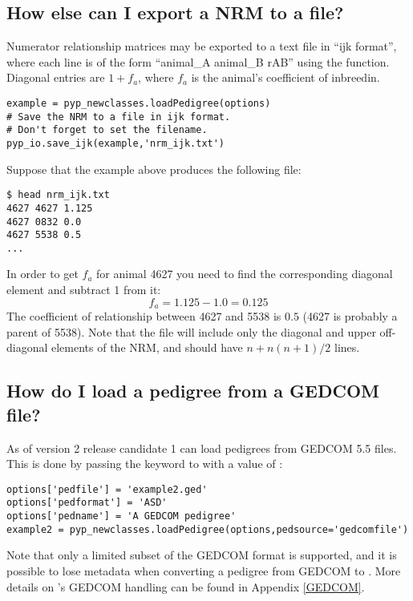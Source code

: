 \subsection{How else can I export a NRM to a file?}
\label{sec:howto-export-nrm-to-ijk-file}
Numerator relationship matrices may be exported to a text file in ``ijk format'',
where each line is of the form ``animal\_A animal\_B rAB'' using the  function. Diagonal entries are $1 + f_a$, where $f_a$ is the animal's coefficient of inbreedin.
\begin{verbatim}
example = pyp_newclasses.loadPedigree(options)
# Save the NRM to a file in ijk format.
# Don't forget to set the filename.
pyp_io.save_ijk(example,'nrm_ijk.txt')
\end{verbatim}
Suppose that the example above produces the following file:
\begin{verbatim}
$ head nrm_ijk.txt
4627 4627 1.125
4627 0832 0.0
4627 5538 0.5
...
\end{verbatim}
In order to get $f_a$ for animal 4627 you need to find the corresponding diagonal element and subtract 1 from it:
\[
f_a = 1.125 - 1.0 = 0.125
\]
The coefficient of relationship between 4627 and 5538 is $0.5$ (4627 is probably a parent of 5538). Note that the file  will include only the diagonal and upper off-diagonal elements of the NRM, and should have $n + n(n+1)/2$ lines.
\subsection{How do I load a pedigree from a GEDCOM file?}
\label{sec:howto-load-gedcom-pedigree}
As of version 2 release candidate 1 \PyPedal{} can load pedigrees from GEDCOM 5.5 files. This is done by passing the  keyword to  with a value of :
\begin{verbatim}
options['pedfile'] = 'example2.ged'
options['pedformat'] = 'ASD'
options['pedname'] = 'A GEDCOM pedigree'
example2 = pyp_newclasses.loadPedigree(options,pedsource='gedcomfile')
\end{verbatim}
Note that only a limited subset of the GEDCOM format is supported, and it is possible to lose metadata when converting a pedigree from GEDCOM to \PyPedal{}. More details on \PyPedal{}'s GEDCOM handling can be found in Appendix \ref{GEDCOM}.
